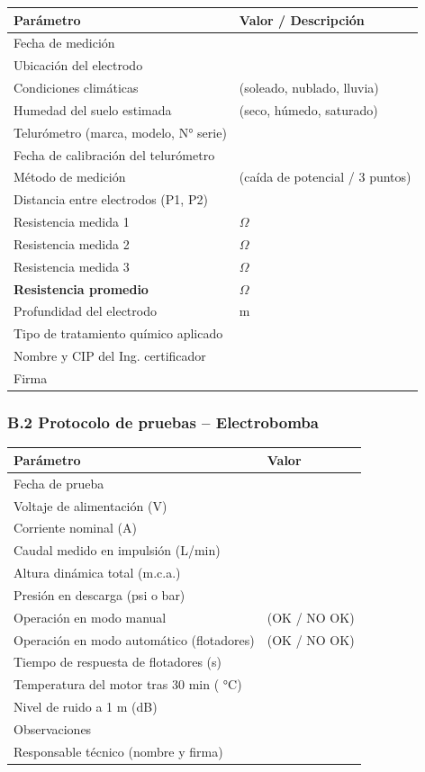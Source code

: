 \documentclass[12pt,a4paper]{article}
\begin{document}
\begin{center}
\begin{tabular}{L{6cm}L{8cm}}
\toprule
\textbf{Parámetro} & \textbf{Valor / Descripción} \\
\midrule
Fecha de medición & \\
Ubicación del electrodo & \\
Condiciones climáticas & (soleado, nublado, lluvia) \\
Humedad del suelo estimada & (seco, húmedo, saturado) \\
Telurómetro (marca, modelo, N° serie) & \\
Fecha de calibración del telurómetro & \\
Método de medición & (caída de potencial / 3 puntos) \\
Distancia entre electrodos (P1, P2) & \\
Resistencia medida 1 & $\Omega$ \\
Resistencia medida 2 & $\Omega$ \\
Resistencia medida 3 & $\Omega$ \\
\textbf{Resistencia promedio} & \textbf{$\Omega$} \\
Profundidad del electrodo & m \\
Tipo de tratamiento químico aplicado & \\
Nombre y CIP del Ing. certificador & \\
Firma & \\
\bottomrule
\end{tabular}
\end{center}

\subsubsection{B.2 Protocolo de pruebas -- Electrobomba}

\begin{center}
\begin{tabular}{L{6cm}L{8cm}}
\toprule
\textbf{Parámetro} & \textbf{Valor} \\
\midrule
Fecha de prueba & \\
Voltaje de alimentación (V) & \\
Corriente nominal (A) & \\
Caudal medido en impulsión (L/min) & \\
Altura dinámica total (m.c.a.) & \\
Presión en descarga (psi o bar) & \\
Operación en modo manual & (OK / NO OK) \\
Operación en modo automático (flotadores) & (OK / NO OK) \\
Tiempo de respuesta de flotadores (s) & \\
Temperatura del motor tras 30 min ( °C) & \\
Nivel de ruido a 1 m (dB) & \\
Observaciones & \\
Responsable técnico (nombre y firma) & \\
\bottomrule
\end{tabular}
\end{center}
\end{document}
